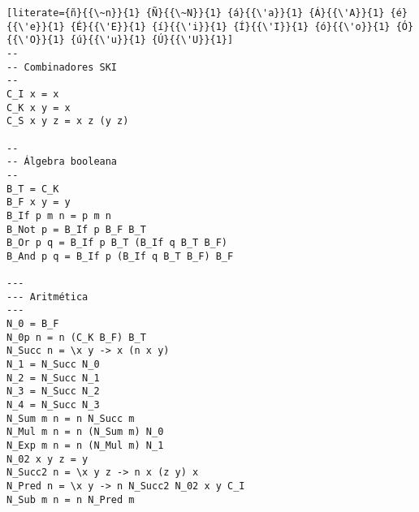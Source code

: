 \begin{lstlisting}[literate={ñ}{{\~n}}{1} {Ñ}{{\~N}}{1} {á}{{\'a}}{1} {Á}{{\'A}}{1} {é}{{\'e}}{1} {É}{{\'E}}{1} {í}{{\'i}}{1} {Í}{{\'I}}{1} {ó}{{\'o}}{1} {Ó}{{\'O}}{1} {ú}{{\'u}}{1} {Ú}{{\'U}}{1}]
-- 
-- Combinadores SKI
--
C_I x = x
C_K x y = x
C_S x y z = x z (y z)

--
-- Álgebra booleana
--
B_T = C_K
B_F x y = y
B_If p m n = p m n
B_Not p = B_If p B_F B_T
B_Or p q = B_If p B_T (B_If q B_T B_F)
B_And p q = B_If p (B_If q B_T B_F) B_F

---
--- Aritmética
---
N_0 = B_F
N_0p n = n (C_K B_F) B_T
N_Succ n = \x y -> x (n x y)
N_1 = N_Succ N_0
N_2 = N_Succ N_1
N_3 = N_Succ N_2
N_4 = N_Succ N_3
N_Sum m n = n N_Succ m
N_Mul m n = n (N_Sum m) N_0
N_Exp m n = n (N_Mul m) N_1
N_02 x y z = y
N_Succ2 n = \x y z -> n x (z y) x
N_Pred n = \x y -> n N_Succ2 N_02 x y C_I
N_Sub m n = n N_Pred m
\end{lstlisting}

